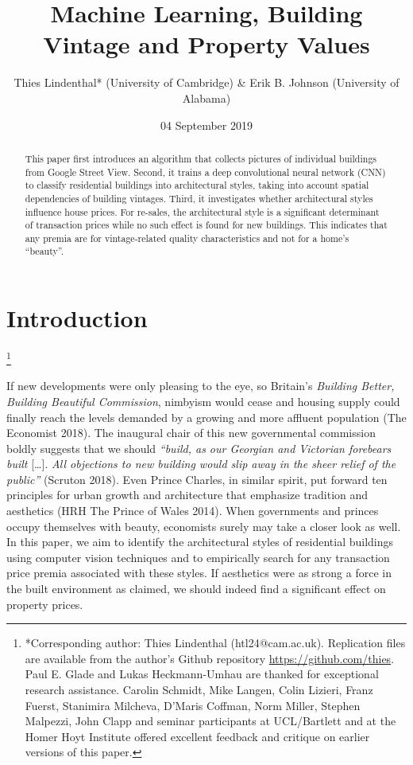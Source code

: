 \documentclass[]{article}
\title{Machine Learning, Building Vintage and Property Values}
\author{Thies Lindenthal* (University of Cambridge) \& Erik B. Johnson
(University of Alabama)}
\date{04 September 2019}
\let\rmarkdownfootnote\footnote%
\def\footnote{\protect\rmarkdownfootnote}
\begin{document}
\maketitle
\begin{abstract}
This paper first introduces an algorithm that collects pictures of
individual buildings from Google Street View. Second, it trains a deep
convolutional neural network (CNN) to classify residential buildings
into architectural styles, taking into account spatial dependencies of
building vintages. Third, it investigates whether architectural styles
influence house prices. For re-sales, the architectural style is a
significant determinant of transaction prices while no such effect is
found for new buildings. This indicates that any premia are for
vintage-related quality characteristics and not for a home's ``beauty''.
\end{abstract}

\hypertarget{introduction}{%
\section{Introduction}\label{introduction}}

\let\svthefootnote\thefootnote
\let\thefootnote\relax

\footnote{{*Corresponding author: Thies Lindenthal (htl24@cam.ac.uk). Replication files are available from the author's Github repository \href{https://github.com/thies}{https://github.com/thies}. Paul E. Glade and Lukas Heckmann-Umhau are thanked for exceptional research assistance. Carolin Schmidt, Mike Langen, Colin Lizieri, Franz Fuerst, Stanimira Milcheva, D'Maris Coffman, Norm Miller, Stephen Malpezzi, John Clapp and seminar participants at UCL/Bartlett and at the Homer Hoyt Institute offered excellent feedback and critique on earlier versions of this paper.}}

\addtocounter{footnote}{-1}\let\thefootnote\svthefootnote

If new developments were only pleasing to the eye, so Britain's
\emph{Building Better, Building Beautiful Commission}, nimbyism would
cease and housing supply could finally reach the levels demanded by a
growing and more affluent population (The Economist 2018). The inaugural
chair of this new governmental commission boldly suggests that we should
\emph{``build, as our Georgian and Victorian forebears built}
{[}\ldots{}{]}. \emph{All objections to new building would slip away in
the sheer relief of the public''} (Scruton 2018). Even Prince Charles,
in similar spirit, put forward ten principles for urban growth and
architecture that emphasize tradition and aesthetics (HRH The Prince of
Wales 2014). When governments and princes occupy themselves with beauty,
economists surely may take a closer look as well. In this paper, we aim
to identify the architectural styles of residential buildings using
computer vision techniques and to empirically search for any transaction
price premia associated with these styles. If aesthetics were as strong
a force in the built environment as claimed, we should indeed find a
significant effect on property prices.
\end{document}
